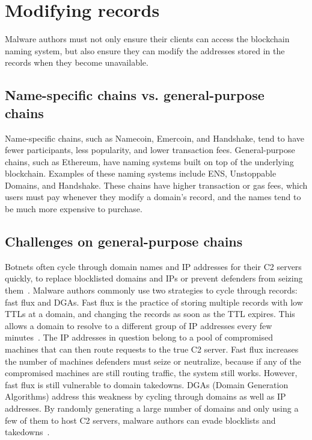 \section{Modifying records}

Malware authors must not only ensure their clients can access the blockchain 
naming system, but 
also ensure they can modify the addresses stored in the records when they 
become unavailable.

\subsection{Name-specific chains vs. general-purpose chains}

Name-specific chains, such as Namecoin, Emercoin, and 
Handshake, tend to have fewer participants, less popularity, 
and lower transaction fees. General-purpose chains, such as 
Ethereum, have naming systems built on top of the underlying blockchain. 
Examples of these naming systems include ENS, Unstoppable Domains, and 
Handshake. These chains have higher transaction or gas fees, which users 
must pay whenever they modify a domain's record, and the names tend to be much 
more expensive to purchase. 

\subsection{Challenges on general-purpose chains}


Botnets often cycle through domain names and IP addresses for their C2 servers 
quickly, to replace 
blocklisted domains and IPs or prevent defenders from seizing 
them~\cite{nadji_beheading_2013}. 
Malware authors commonly use two strategies to cycle through records: fast 
flux and DGAs. Fast flux 
is the practice of storing multiple records with low TTLs at a domain, and 
changing the records as 
soon as the TTL expires. This allows a domain to resolve to a different group 
of IP addresses every 
few minutes~\cite{holz_measuring_2008}. The IP addresses in question belong 
to a pool of 
compromised machines that can then route requests to the true C2 server. Fast 
flux increases the 
number of machines defenders must seize or neutralize, because if any of the 
compromised machines 
are still routing traffic, the system still works. However, fast flux is 
still vulnerable to domain 
takedowns. DGAs (Domain Generation Algorithms) address this weakness by cycling 
through domains as 
well as IP addresses. By randomly generating a large number of domains and 
only using a few of them 
to host C2 servers, malware authors can evade blocklists and  
takedowns~\cite{antonakakis_throw-away_2012}.

